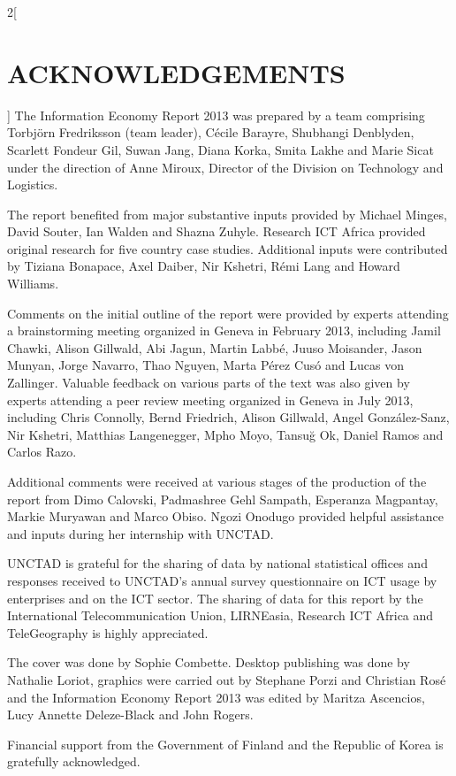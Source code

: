 \documentclass[a4paper, UTF8, 12pt]{article}
\begin{document}
\begin{paracol}{2}[\section{ACKNOWLEDGEMENTS}]
   The Information Economy Report 2013 was prepared by a team comprising Torbjörn Fredriksson (team leader), Cécile Barayre, Shubhangi Denblyden, Scarlett Fondeur Gil, Suwan Jang, Diana Korka, Smita Lakhe and Marie Sicat under the direction of Anne Miroux, Director of the Division on Technology and Logistics. 
   
   The report benefited from major substantive inputs provided by Michael Minges, David Souter, Ian Walden and Shazna Zuhyle. Research ICT Africa provided original research for five country case studies. Additional inputs were contributed by Tiziana Bonapace, Axel Daiber, Nir Kshetri, Rémi Lang and Howard Williams. 
   
   Comments on the initial outline of the report were provided by experts attending a brainstorming meeting organized in Geneva in February 2013, including Jamil Chawki, Alison Gillwald, Abi Jagun, Martin Labbé, Juuso Moisander, Jason Munyan, Jorge Navarro, Thao Nguyen, Marta Pérez Cusó and Lucas von Zallinger. Valuable feedback on various parts of the text was also given by experts attending a peer review meeting organized in Geneva in July 2013, including Chris Connolly, Bernd Friedrich, Alison Gillwald, Angel González-Sanz, Nir Kshetri, Matthias Langenegger, Mpho Moyo, Tansuğ Ok, Daniel Ramos and Carlos Razo. 
   
   Additional comments were received at various stages of the production of the report from Dimo Calovski, Padmashree Gehl Sampath, Esperanza Magpantay, Markie Muryawan and Marco Obiso. Ngozi Onodugo provided helpful assistance and inputs during her internship with UNCTAD. 
   
   UNCTAD is grateful for the sharing of data by national statistical offices and responses received to UNCTAD’s annual survey questionnaire on ICT usage by enterprises and on the ICT sector. The sharing of data for this report by the International Telecommunication Union, LIRNEasia, Research ICT Africa and TeleGeography is highly appreciated. 
   
   The cover was done by Sophie Combette. Desktop publishing was done by Nathalie Loriot, graphics were carried out by Stephane Porzi and Christian Rosé and the Information Economy Report 2013 was edited by Maritza Ascencios, Lucy Annette Deleze-Black and John Rogers. 
   
   Financial support from the Government of Finland and the Republic of Korea is gratefully acknowledged. 
\end{paracol}
\end{document}
